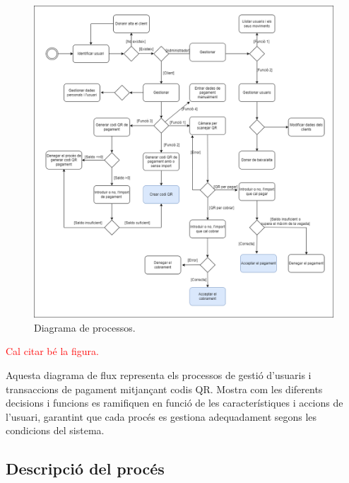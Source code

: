 \documentclass[a4paper,12pt,twoside]{ThesisStyle}
\newcommand{\pau}[1]{\textcolor{red}{#1}}
\begin{document}
\begin{figure}[h]
    \centering
    \includegraphics[width=1\textwidth]{imatges/diagrama processos.png}
    \caption{Diagrama de processos.}
    \label{fig: Diagrama de processos }
\end{figure}

\pau{Cal citar bé la figura.}

Aquesta diagrama de flux representa els processos de gestió d'usuaris i transaccions de pagament mitjançant codis QR. Mostra com les diferents decisions i funcions es ramifiquen en funció de les característiques i accions de l'usuari, garantint que cada procés es gestiona adequadament segons les condicions del sistema.


\subsection{Descripció del procés}
\label{subsec:Descripció del procés}
\end{document}
